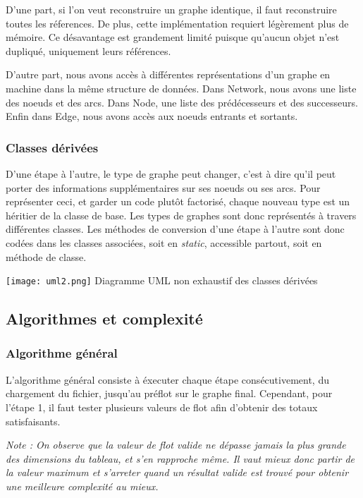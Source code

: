 \documentclass[letterpaper,12pt]{article}
\begin{document}
D'une part, si l'on veut reconstruire un graphe identique, il faut reconstruire toutes les réferences. De plus, cette implémentation requiert légèrement plus de mémoire. Ce désavantage est grandement limité puisque qu'aucun objet n'est dupliqué, uniquement leurs références. 

D'autre part, nous avons accès à différentes représentations d'un graphe en machine dans la même structure de données. Dans Network, nous avons une liste des noeuds et des arcs. Dans Node, une liste des prédécesseurs et des successeurs. Enfin dans Edge, nous avons accès aux noeuds entrants et sortants.

\subsubsection{Classes dérivées}
D'une étape à l'autre, le type de graphe peut changer, c'est à dire qu'il peut porter des informations supplémentaires sur ses noeuds ou ses arcs. Pour représenter ceci, et garder un code plutôt factorisé, chaque nouveau type est un héritier de la classe de base. Les types de graphes sont donc représentés à travers différentes classes. Les méthodes de conversion d'une étape à l'autre sont donc codées dans les classes associées, soit en \textit{static}, accessible partout, soit en méthode de classe.

\begin{center}
    \texttt{[image: uml2.png]}
    Diagramme UML non exhaustif des classes dérivées
\end{center}

\subsection{Algorithmes et complexité} 
\subsubsection{Algorithme général}
L'algorithme général consiste à éxecuter chaque étape consécutivement, du chargement du fichier, jusqu'au préflot sur le graphe final. Cependant, pour l'étape 1, il faut tester plusieurs valeurs de flot afin d'obtenir des totaux satisfaisants.

 \textit{Note : On observe que la valeur de flot valide ne dépasse jamais la plus grande des dimensions du tableau, et s'en rapproche même. Il vaut mieux donc partir de la valeur maximum et s'arreter quand un résultat valide est trouvé pour obtenir une meilleure complexité au mieux.}
\end{document}
